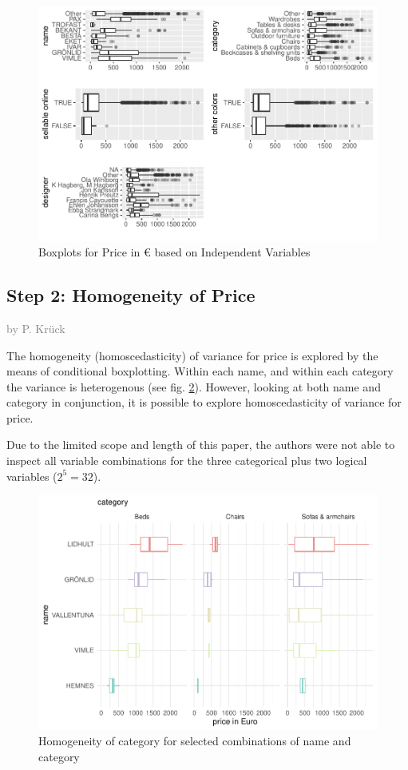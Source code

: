 \documentclass[a4paper, nobind]{templates/ociamthesis}
\begin{document}
\begin{figure}
\includegraphics[width=1\linewidth]{_main_files/figure-latex/outliers-1} \caption{Boxplots for Price in € based on Independent Variables}\label{fig:outliers}
\end{figure}

\hypertarget{step-2-homogeneity-of-price}{%
\subsection{Step 2: Homogeneity of Price}\label{step-2-homogeneity-of-price}}

\textcolor{gray}{by P. Krück}

The homogeneity (homoscedasticity) of variance for price is explored by the means of conditional boxplotting.
Within each name, and within each category the variance is heterogenous (see fig. \ref{fig:homogeneity}). However, looking at both name and category in conjunction, it is possible to explore homoscedasticity of variance for price.

Due to the limited scope and length of this paper, the authors were not able to inspect all variable combinations for the three categorical plus two logical variables (\(2^5=32\)).

\begin{figure}
\includegraphics[width=1\linewidth]{_main_files/figure-latex/homogeneity-1} \caption{Homogeneity of category for selected combinations of name and category}\label{fig:homogeneity}
\end{figure}
\end{document}
